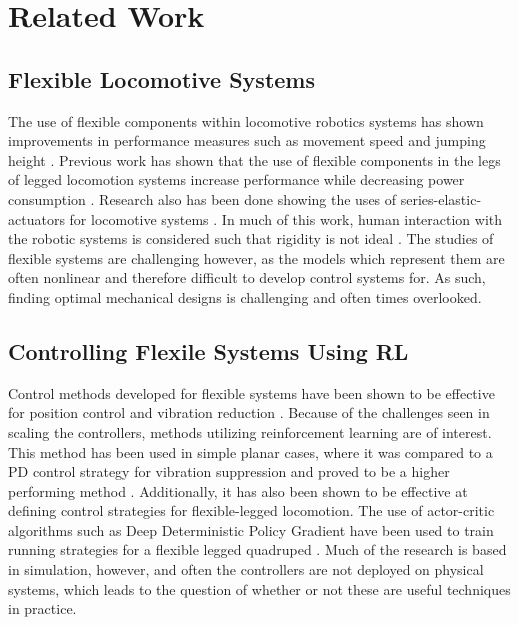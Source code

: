 \documentclass[10pt,twocolumn,letterpaper]{article}
\begin{document}
\section{Related Work}
\label{sec:related_work}
\subsection{Flexible Locomotive Systems}

The use of flexible components within locomotive robotics systems has shown improvements in performance measures such as movement speed and jumping height \cite{Sugiyama2004, Hurst2008}. Previous work has shown that the use of flexible components in the legs of legged locomotion systems increase performance while decreasing power consumption \cite{Saranli2001}. Research also has been done showing the uses of series-elastic-actuators for locomotive systems \cite{Pratt1995}. In much of this work, human interaction with the robotic systems is considered such that rigidity is not ideal \cite{Zhang2019}. The studies of flexible systems are challenging however, as the models which represent them are often nonlinear and therefore difficult to develop control systems for. As such, finding optimal mechanical designs is challenging and often times overlooked. 

\subsection{Controlling Flexile Systems Using RL}

Control methods developed for flexible systems have been shown to be effective for position control and vibration reduction \cite{Luo1993, Ahmadi1997}. Because of the challenges seen in scaling the controllers, methods utilizing reinforcement learning are of interest. This method has been used in simple planar cases, where it was compared to a PD control strategy for vibration suppression and proved to be a higher performing method \cite{He2020f}. Additionally, it has also been shown to be effective at defining control strategies for flexible-legged locomotion. The use of actor-critic algorithms such as Deep Deterministic Policy Gradient \cite{Lillicrap2016h} have been used to train running strategies for a flexible legged quadruped \cite{Dwiel2019d}. Much of the research is based in simulation, however, and often the controllers are not deployed on physical systems, which leads to the question of whether or not these are useful techniques in practice.
\end{document}
